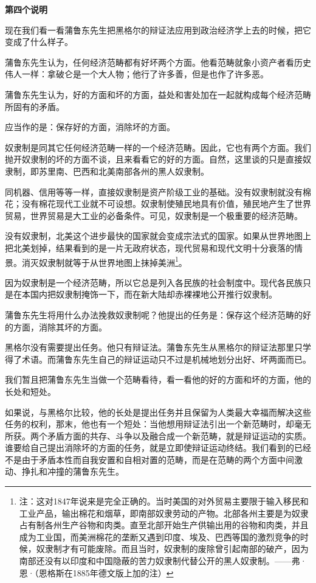 \documentclass[a4paper,twoside,12pt]{ctexart}
\begin{document}
\begin{center}
    \textbf{第四个说明}
\end{center}

现在我们看一看蒲鲁东先生把黑格尔的辩证法应用到政治经济学上去的时候，把它变成了什么样子。

蒲鲁东先生认为，任何经济范畴都有好坏两个方面。他看范畴就象小资产者看历史伟人一样：拿破仑是一个大人物；他行了许多善，但是也作了许多恶。

蒲鲁东先生认为，好的方面和坏的方面，益处和害处加在一起就构成每个经济范畴所固有的矛盾。

应当作的是：保存好的方面，消除坏的方面。

奴隶制是同其它任何经济范畴一样的一个经济范畴。因此，它也有两个方面。我们抛开奴隶制的坏的方面不谈，且来看看它的好的方面。自然，这里谈的只是直接奴隶制，即苏里南、巴西和北美南部各州的黑人奴隶制。

同机器、信用等等一样，直接奴隶制是资产阶级工业的基础。没有奴隶制就没有棉花；没有棉花现代工业就不可设想。奴隶制使殖民地具有价值，殖民地产生了世界贸易，世界贸易是大工业的必备条件。可见，奴隶制是一个极重要的经济范畴。

没有奴隶制，北美这个进步最快的国家就会变成宗法式的国家。如果从世界地图上把北美划掉，结果看到的是一片无政府状态，现代贸易和现代文明十分衰落的情景。消灭奴隶制就等于从世界地图上抹掉美洲\footnote{注：这对1847年说来是完全正确的。当时美国的对外贸易主要限于输入移民和工业产品，输出棉花和烟草，即南部奴隶劳动的产物。北部各州主要是为奴隶占有制各州生产谷物和肉类。直至北部开始生产供输出用的谷物和肉类，并且成为工业国，而美洲棉花的垄断又遇到印度、埃及、巴西等国的激烈竞争的时候，奴隶制才有可能废除。而且当时，奴隶制的废除曾引起南部的破产，因为南部还没有以印度和中国隐蔽的苦力奴隶制代替公开的黑人奴隶制。——弗·恩·（恩格斯在1885年德文版上加的注）}。

因为奴隶制是一个经济范畴，所以它总是列入各民族的社会制度中。现代各民族只是在本国内把奴隶制掩饰一下，而在新大陆却赤裸裸地公开推行奴隶制。

蒲鲁东先生将用什么办法挽救奴隶制呢？他提出的任务是：保存这个经济范畴的好的方面，消除其坏的方面。

黑格尔没有需要提出任务。他只有辩证法。蒲鲁东先生从黑格尔的辩证法那里只学得了术语。而蒲鲁东先生自己的辩证运动只不过是机械地划分出好、坏两面而已。

我们暂且把蒲鲁东先生当做一个范畴看待，看一看他的好的方面和坏的方面，他的长处和短处。

如果说，与黑格尔比较，他的长处是提出任务并且保留为人类最大幸福而解决这些任务的权利，那末，他也有一个短处：当他想用辩证法引出一个新范畴时，却毫无所获。两个矛盾方面的共存、斗争以及融合成一个新范畴，就是辩证运动的实质。谁要给自己提出消除坏的方面的任务，就是立即使辩证运动终结。我们看到的已经不是由于矛盾本性而自我安置和自相对置的范畴，而是在范畴的两个方面中间激动、挣扎和冲撞的蒲鲁东先生。
\end{document}
